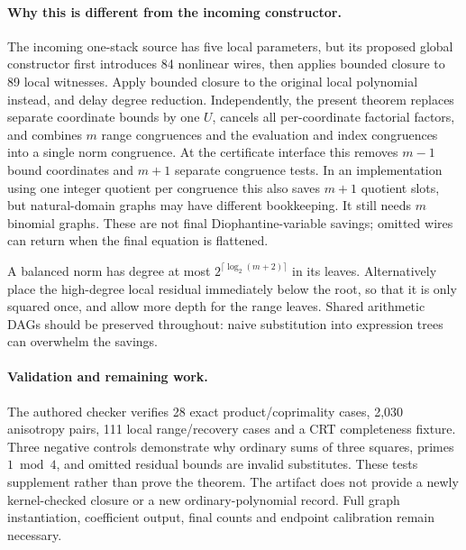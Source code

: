 \paragraph{Why this is different from the incoming constructor.}
The incoming one-stack source has five local parameters, but its proposed
global constructor first introduces 84 nonlinear wires, then applies
bounded closure to 89 local witnesses. Apply bounded closure to the
original local polynomial instead, and delay degree reduction. Independently,
the present theorem replaces separate coordinate bounds by one $U$, cancels
all per-coordinate factorial factors, and combines $m$ range congruences
and the evaluation and index congruences into a single norm congruence.
At the certificate interface this removes $m-1$ bound coordinates and
$m+1$ separate congruence tests. In an implementation using one integer
quotient per congruence this also saves $m+1$ quotient slots, but natural-domain
graphs may have different bookkeeping. It still needs $m$ binomial graphs.
These are not final Diophantine-variable savings; omitted wires can return
when the final equation is flattened.

A balanced norm has degree at most $2^{\lceil\log_2(m+2)\rceil}$ in its
leaves. Alternatively place the high-degree local residual immediately
below the root, so that it is only squared once, and allow more depth for
the range leaves. Shared arithmetic DAGs should be preserved throughout:
naive substitution into expression trees can overwhelm the savings.

\paragraph{Validation and remaining work.}
The authored checker verifies 28 exact product/coprimality cases,
2,030 anisotropy pairs, 111 local range/recovery cases and a CRT completeness
fixture. Three negative controls demonstrate why ordinary sums of three
squares, primes $1\bmod4$, and omitted residual bounds are invalid
substitutes. These tests supplement rather than prove the theorem.
The artifact does not provide a newly kernel-checked closure or a new
ordinary-polynomial record. Full graph instantiation, coefficient output,
final counts and endpoint calibration remain necessary.
